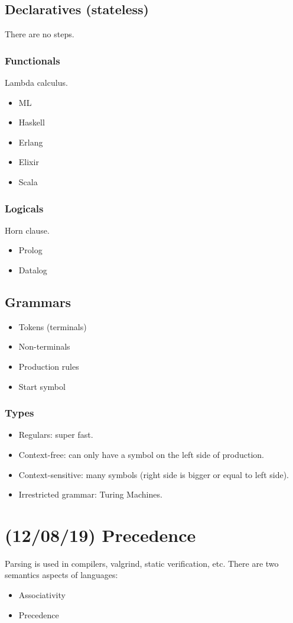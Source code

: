 \documentclass[11pt]{article}
\begin{document}
\subsection{Declaratives (stateless)}
\label{sec:orgf1c156d}
There are no steps.
\subsubsection{Functionals}
\label{sec:org947befc}
Lambda calculus.
\begin{itemize}
\item ML
\item Haskell
\item Erlang
\item Elixir
\item Scala
\end{itemize}
\subsubsection{Logicals}
\label{sec:org9529d20}
Horn clause.
\begin{itemize}
\item Prolog
\item Datalog
\end{itemize}
\subsection{Grammars}
\label{sec:org5bc8751}
\begin{itemize}
\item Tokens (terminals)
\item Non-terminals
\item Production rules
\item Start symbol
\end{itemize}
\subsubsection{Types}
\label{sec:orgdb27402}
\begin{itemize}
\item Regulars: super fast.
\item Context-free: can only have a symbol on the left side of production.
\item Context-sensitive: many symbols (right side is bigger or equal to left side).
\item Irrestricted grammar: Turing Machines.
\end{itemize}
\section{(12/08/19) Precedence}
\label{sec:orgdae3c73}
Parsing is used in compilers, valgrind, static verification, etc.
There are two semantics aspects of languages:
\begin{itemize}
\item Associativity
\item Precedence
\end{itemize}
\end{document}
